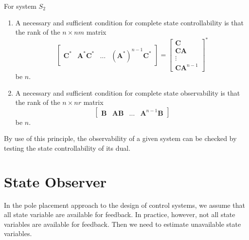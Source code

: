 \documentclass[11pt,a4paper,oneside]{book}
\numberwithin{equation}{section}
\theoremstyle{it}
\theoremstyle{definition}
\begin{document}
\noindent For system $S_2$
\begin{enumerate}[label=\textbf{\arabic*}]
	\item A necessary and sufficient condition for complete state 
	controllability is that the rank of the $n 	\times nm$ matrix 
	$$
	\begin{bmatrix}
		\mathbf{C}^* & \mathbf{A}^*\mathbf{C}^* & \dots & (\mathbf{A}^*)^{n-1}\mathbf{C}^*
	\end{bmatrix}= 
	\begin{bmatrix}
		\mathbf{C}  \\
		\mathbf{CA} \\
		\vdots \\
		\mathbf{CA}^{n-1}
	\end{bmatrix}^*
	$$
	be $n$.
	\item A necessary and sufficient condition for complete state observability 
	is that the rank of the $n 	\times nr$ matrix 
	$$
	\begin{bmatrix}
		\mathbf{B} & \mathbf{AB} & \dots & \mathbf{A}^{n-1}\mathbf{B}
	\end{bmatrix}
	$$
	be $n$.
\end{enumerate}
{By use of this principle, the observability of a given system can be checked 
by testing the state controllability of its dual.}

\section{State Observer} 
In the pole placement approach to the design of control systems, we assume that 
all state variable are available for feedback. In practice, however, not all 
state variables are available for feedback. Then we need to estimate 
unavailable state variables.
\end{document}
